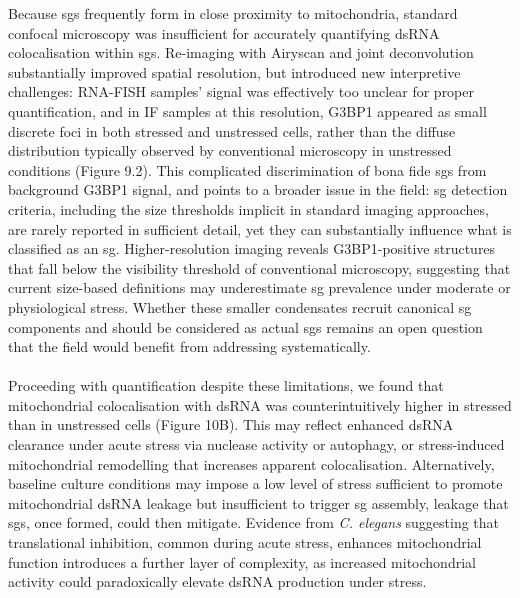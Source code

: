 Because \gls{sg}s frequently form in close proximity to mitochondria\cite{amen_stress_2021, fung_production_2013}, standard confocal microscopy was insufficient for accurately quantifying dsRNA colocalisation within \gls{sg}s. Re-imaging with Airyscan and joint deconvolution substantially improved spatial resolution, but introduced new interpretive challenges: RNA-FISH samples' signal was effectively too unclear for proper quantification, and in IF samples  at this resolution, G3BP1 appeared as small discrete foci in both stressed and unstressed cells, rather than the diffuse distribution typically observed by conventional microscopy in unstressed conditions (Figure 9.2). This complicated discrimination of bona fide \gls{sg}s from background G3BP1 signal, and points to a broader issue in the field: \gls{sg} detection criteria, including the size thresholds implicit in standard imaging approaches, are rarely reported in sufficient detail, yet they can substantially influence what is classified as an \gls{sg}. Higher-resolution imaging reveals G3BP1-positive structures that fall below the visibility threshold of conventional microscopy, suggesting that current size-based definitions may underestimate \gls{sg} prevalence under moderate or physiological stress. Whether these smaller condensates recruit canonical \gls{sg} components and should be considered as actual \gls{sg}s remains an open question that the field would benefit from addressing systematically.
\\
\\
Proceeding with quantification despite these limitations, we found that mitochondrial colocalisation with dsRNA was counterintuitively higher in stressed than in unstressed cells (Figure 10B). This may reflect enhanced dsRNA clearance under acute stress via nuclease activity or autophagy, or stress-induced mitochondrial remodelling that increases apparent colocalisation. Alternatively, baseline culture conditions may impose a low level of stress sufficient to promote mitochondrial dsRNA leakage but insufficient to trigger \gls{sg} assembly, leakage that \gls{sg}s, once formed, could then mitigate. Evidence from \textit{C. elegans} suggesting that translational inhibition, common during acute stress\cite{kedersha_g3bpcaprin1usp10_2016}, enhances mitochondrial function\cite{mallick_amp_2025} introduces a further layer of complexity, as increased mitochondrial activity could paradoxically elevate dsRNA production under stress.
